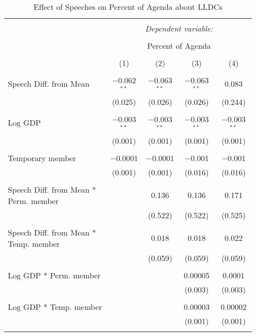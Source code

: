 
\begin{table}[!htbp] \centering 
  \caption{Effect of Speeches on Percent of Agenda about LLDCs} 
  \label{} 
\begin{tabular}{@{\extracolsep{5pt}}lcccc} 
\\[-1.8ex]\hline 
\hline \\[-1.8ex] 
 & \multicolumn{4}{c}{\textit{Dependent variable:}} \\ 
\cline{2-5} 
\\[-1.8ex] & \multicolumn{4}{c}{Percent of Agenda} \\ 
\\[-1.8ex] & (1) & (2) & (3) & (4)\\ 
\hline \\[-1.8ex] 
 Speech Diff. from Mean & $-$0.062$^{**}$ & $-$0.063$^{**}$ & $-$0.063$^{**}$ & 0.083 \\ 
  & (0.025) & (0.026) & (0.026) & (0.244) \\ 
  & & & & \\ 
 Log GDP & $-$0.003$^{**}$ & $-$0.003$^{**}$ & $-$0.003$^{**}$ & $-$0.003$^{**}$ \\ 
  & (0.001) & (0.001) & (0.001) & (0.001) \\ 
  & & & & \\ 
 Temporary member & $-$0.0001 & $-$0.0001 & $-$0.001 & $-$0.001 \\ 
  & (0.001) & (0.001) & (0.016) & (0.016) \\ 
  & & & & \\ 
 Speech Diff. from Mean * Perm. member &  & 0.136 & 0.136 & 0.171 \\ 
  &  & (0.522) & (0.522) & (0.525) \\ 
  & & & & \\ 
 Speech Diff. from Mean * Temp. member &  & 0.018 & 0.018 & 0.022 \\ 
  &  & (0.059) & (0.059) & (0.059) \\ 
  & & & & \\ 
 Log GDP * Perm. member &  &  & 0.00005 & 0.0001 \\ 
  &  &  & (0.003) & (0.003) \\ 
  & & & & \\ 
 Log GDP * Temp. member &  &  & 0.00003 & 0.00002 \\ 
  &  &  & (0.001) & (0.001) \\ 
  & & & & \\ 

\end{tabular}
\end{table}
